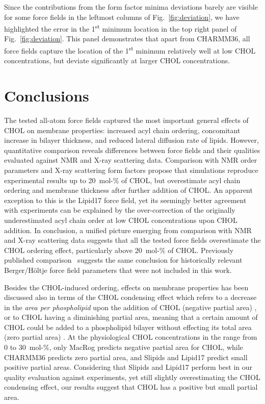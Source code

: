 \documentclass[journal=jctcce]{achemso}
\begin{document}
Since the contributions from the form factor minima deviations barely are visible for some force fields in the leftmost columns of Fig.~\ref{fig:deviation}, we have highlighted the error in the 1\textsuperscript{st} minimum location in the top right panel of Fig.~\ref{fig:deviation}. This panel demonstrates that apart from CHARMM36, all force fields capture the location of the 1\textsuperscript{st} minimum relatively well at low CHOL concentrations, but deviate significantly at larger CHOL concentrations. 

\section{Conclusions}

The tested all-atom force fields captured the most important general effects of CHOL on membrane properties: increased acyl chain ordering, concomitant increase in bilayer thickness, and reduced lateral diffusion rate of lipids. However, quantitative comparison reveals differences between force fields and their qualities evaluated against NMR and X-ray scattering data. Comparison with NMR order parameters and X-ray scattering form factors propose that simulations reproduce experimental results up to 20~mol-\% of CHOL, but overestimate acyl chain ordering and membrane thickness after further addition of CHOL. An apparent exception to this is the Lipid17 force field, yet its seemingly better agreement with experiments can be explained by the over-correction of the originally underestimated acyl chain order at low CHOL concentrations upon CHOL addition. In conclusion, a unified picture emerging from comparison with NMR and X-ray scattering data suggests that all the tested force fields overestimate the CHOL ordering effect, particularly above 20~mol-\% of CHOL. Previously published comparison~\cite{ferreira13} suggests the same conclusion for historically relevant Berger/H{\"o}ltje force field parameters \cite{Berger97,Holtje01} that were not included in this work.

Besides the CHOL-induced ordering, effects on membrane properties has been discussed also in terms of the CHOL condensing effect which refers to a decrease in the \emph{area per phospholipid} upon the addition of CHOL (negative partial area) \cite{edholm2005areas}, or to CHOL having a diminishing partial area, meaning that a certain amount of CHOL could be added to a phospholipid bilayer without effecting its total area (zero partial area) \cite{javanainen2017two}. At the physiological CHOL concentrations in the range from 0 to 30~mol-\%, only MacRog predicts negative partial area for CHOL, while CHARMM36 predicts zero partial area, and Slipids and Lipid17 predict small positive partial areas. Considering that Slipids and Lipid17 perform best in our quality evaluation against experiments, yet still slightly overestimating the CHOL condensing effect, our results suggest that CHOL has a positive but small partial area.
\end{document}
